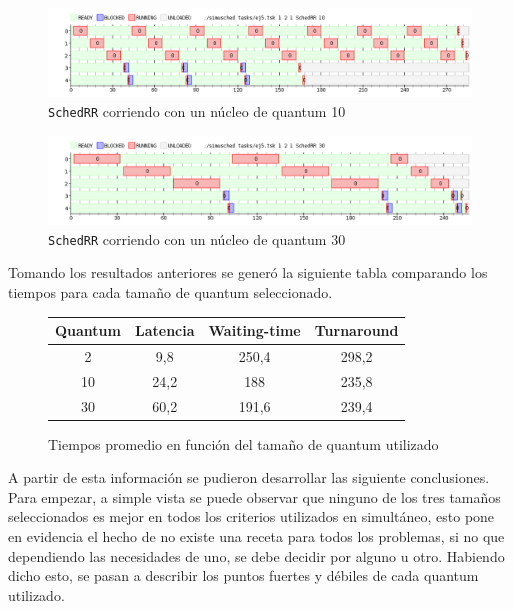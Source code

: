 \begin{figure}[H]
	\begin{center}
		\includegraphics[width=1\columnwidth]{imagenes/ej5_q10.png}
		\caption{\texttt{SchedRR} corriendo con un núcleo de quantum 10}
	\end{center}
\end{figure}

\begin{figure}[H]
	\begin{center}
		\includegraphics[width=1\columnwidth]{imagenes/ej5_q30.png}
		\caption{\texttt{SchedRR} corriendo con un núcleo de quantum 30}
	\end{center}
\end{figure}

Tomando los resultados anteriores se generó la siguiente tabla comparando los
tiempos para cada tamaño de quantum seleccionado.

\begin{figure}[H]
	\begin{center}
		\begin{tabular}{|c|c|c|c|}
			\hline
			\textbf{Quantum} & \textbf{Latencia} & \textbf{Waiting-time} & \textbf{Turnaround} \\ \hline
			2 & 9,8 & 250,4 & 298,2 \\ \hline
			10 & 24,2 & 188 & 235,8 \\ \hline
			30 & 60,2 & 191,6 & 239,4 \\ \hline
		\end{tabular}
		\caption{Tiempos promedio en función del tamaño de quantum utilizado}
	\end{center}
\end{figure}

A partir de esta información se pudieron desarrollar las siguiente conclusiones.
Para empezar, a simple vista se puede observar que ninguno de los tres tamaños
seleccionados es mejor en todos los criterios utilizados en simultáneo, esto
pone en evidencia el hecho de no existe una receta para todos los problemas, si
no que dependiendo las necesidades de uno, se debe decidir por alguno u otro.
Habiendo dicho esto, se pasan a describir los puntos fuertes y débiles de cada
quantum utilizado.

